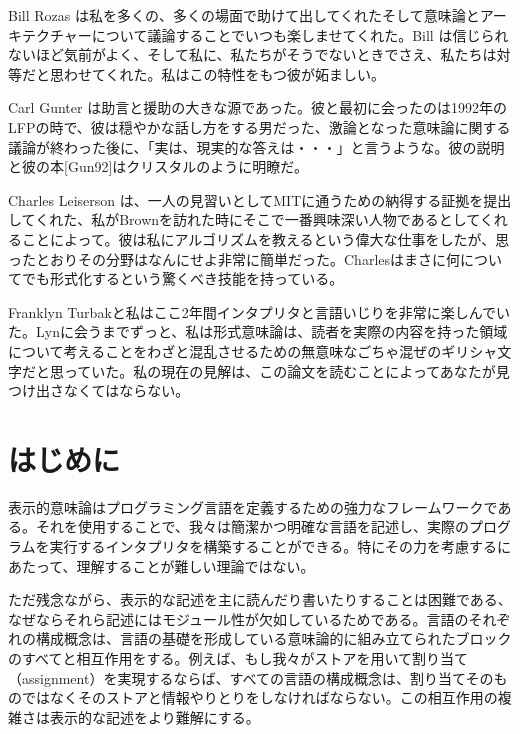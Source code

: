 \documentclass[11pt, oneside]{jsarticle}   	%
\begin{document}
Bill Rozas は私を多くの、多くの場面で助けて出してくれたそして意味論とアーキテクチャーについて議論することでいつも楽しませてくれた。Bill は信じられないほど気前がよく、そして私に、私たちがそうでないときでさえ、私たちは対等だと思わせてくれた。私はこの特性をもつ彼が妬ましい。

Carl Gunter は助言と援助の大きな源であった。彼と最初に会ったのは1992年のLFPの時で、彼は穏やかな話し方をする男だった、激論となった意味論に関する議論が終わった後に、「実は、現実的な答えは・・・」と言うような。彼の説明と彼の本[Gun92]はクリスタルのように明瞭だ。

Charles Leiserson は、一人の見習いとしてMITに通うための納得する証拠を提出してくれた、私がBrownを訪れた時にそこで一番興味深い人物であるとしてくれることによって。彼は私にアルゴリズムを教えるという偉大な仕事をしたが、思ったとおりその分野はなんにせよ非常に簡単だった。Charlesはまさに何についてでも形式化するという驚くべき技能を持っている。

Franklyn Turbakと私はここ2年間インタプリタと言語いじりを非常に楽しんでいた。Lynに会うまでずっと、私は形式意味論は、読者を実際の内容を持った領域について考えることをわざと混乱させるための無意味なごちゃ混ぜのギリシャ文字だと思っていた。私の現在の見解は、この論文を読むことによってあなたが見つけ出さなくてはならない。
\newpage


\section{はじめに}
表示的意味論はプログラミング言語を定義するための強力なフレームワークである。それを使用することで、我々は簡潔かつ明確な言語を記述し、実際のプログラムを実行するインタプリタを構築することができる。特にその力を考慮するにあたって、理解することが難しい理論ではない。

ただ残念ながら、表示的な記述を主に読んだり書いたりすることは困難である、なぜならそれら記述にはモジュール性が欠如しているためである。言語のそれぞれの構成概念は、言語の基礎を形成している意味論的に組み立てられたブロックのすべてと相互作用をする。例えば、もし我々がストアを用いて割り当て（assignment）を実現するならば、すべての言語の構成概念は、割り当てそのものではなくそのストアと情報やりとりをしなければならない。この相互作用の複雑さは表示的な記述をより難解にする。
\end{document}

